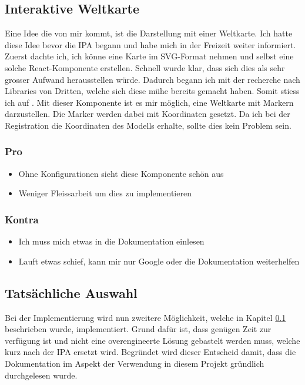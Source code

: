 \subsection{Interaktive Weltkarte} \label{mdlauswl-b}
Eine Idee die von mir kommt, ist die Darstellung mit einer Weltkarte. Ich hatte diese Idee bevor die IPA begann und habe mich in der Freizeit weiter informiert. Zuerst dachte ich, ich könne eine Karte im SVG-Format nehmen und selbst eine solche React-Komponente erstellen. Schnell wurde klar, dass sich dies als sehr grosser Aufwand herausstellen würde. Dadurch begann ich mit der recherche nach Libraries von Dritten, welche sich diese mühe bereits gemacht haben. Somit stiess ich auf \href{https://www.react-simple-maps.io/}{}.
\newline
Mit dieser Komponente ist es mir möglich, eine Weltkarte mit Markern darzustellen. Die Marker werden dabei mit Koordinaten gesetzt. Da ich bei der Registration die Koordinaten des Modells erhalte, sollte dies kein Problem sein.
\subsubsection{Pro}
\begin{itemize}
  \item Ohne Konfigurationen sieht diese Komponente schön aus
  \item Weniger Fleissarbeit um dies zu implementieren
\end{itemize}
\subsubsection{Kontra}
\begin{itemize}
  \item Ich muss mich etwas in die Dokumentation einlesen
  \item Lauft etwas schief, kann mir nur Google oder die Dokumentation weiterhelfen
\end{itemize}
\subsection{Tatsächliche Auswahl}
Bei der Implementierung wird nun zweitere Möglichkeit, welche in Kapitel \ref{mdlauswl-b} beschrieben wurde, implementiert. Grund dafür ist, dass genügen Zeit zur verfügung ist und nicht eine overengineerte Lösung gebastelt werden muss, welche kurz nach der IPA ersetzt wird. Begründet wird dieser Entscheid damit, dass die Dokumentation im Aspekt der Verwendung in diesem Projekt gründlich durchgelesen wurde. 
